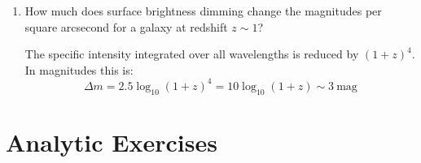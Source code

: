 \begin{enumerate}
\item How much does surface brightness dimming change the magnitudes
  per square arcsecond for a galaxy at redshift $z\sim 1$?

\begin{answer}
The specific intensity integrated over all wavelengths is reduced by
$(1+z)^4$. In magnitudes this is:
\begin{equation}
\Delta m = 2.5 \log_{10} (1+z)^4 = 10 \log_{10} (1+z) \sim
3 \mathrm{~mag}
\end{equation}
\end{answer}
\end{enumerate}   

\section{Analytic Exercises}

